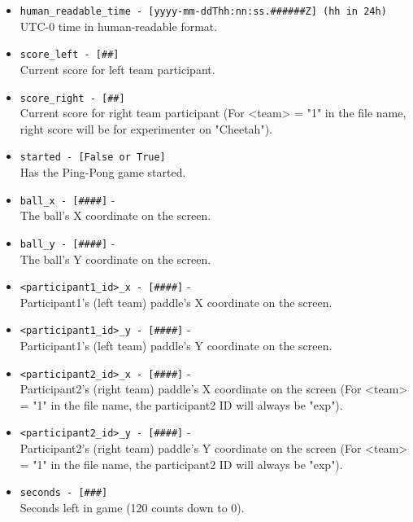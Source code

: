 \begin{description}
\begin{addmargin}[0em]{0em}
\begin{addmargin}[1em]{0em}
\begin{itemize}
                \item \verb|human_readable_time - [yyyy-mm-ddThh:nn:ss.######Z] (hh in 24h)|\\ UTC-0 time in human-readable format.
                \item \verb|score_left - [##]|\\ Current score for left team participant.
                \item \verb|score_right - [##]|\\ Current score for right team participant (For <team> = "1" in the file name, right score will be for experimenter on "Cheetah").
                \item \verb|started - [False or True]|\\Has the Ping-Pong game started.
                \item \verb|ball_x - [####]| - \\The ball's X coordinate on the screen.
                \item \verb|ball_y - [####]| - \\The ball's Y coordinate on the screen.
                \item \verb|<participant1_id>_x - [####]| -\\Participant1's (left team) paddle's X coordinate on the screen.
                \item \verb|<participant1_id>_y - [####]| -\\Participant1's (left team) paddle's Y coordinate on the screen.
                \item \verb|<participant2_id>_x - [####]| -\\Participant2's (right team) paddle's X coordinate on the screen (For <team> = "1" in the file name, the participant2 ID will always be "exp").
                \item \verb|<participant2_id>_y - [####]| -\\Participant2's (right team) paddle's Y coordinate on the screen (For <team> = "1" in the file name, the participant2 ID will always be "exp").
                \item \verb|seconds - [###]|\\Seconds left in game (120 counts down to 0).
            \end{itemize}
        \end{addmargin} %



\end{addmargin}
\end{description}
